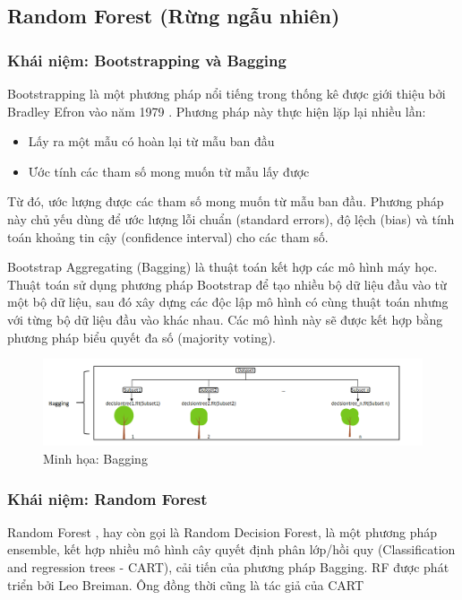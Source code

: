 \subsection{Random Forest (Rừng ngẫu nhiên)}
    \label{label:rf}
    \subsubsection{Khái niệm: Bootstrapping và Bagging}
    
    Bootstrapping là một phương pháp nổi tiếng trong thống kê được giới thiệu bởi Bradley Efron vào năm 1979 \cite{efron1992bootstrap}. Phương pháp này thực hiện lặp lại nhiều lần:
        \begin{itemize}
            \item Lấy ra một mẫu có hoàn lại từ mẫu ban đầu
            \item Ước tính các tham số mong muốn từ mẫu lấy được
        \end{itemize}
    Từ đó, ước lượng được các tham số mong muốn từ mẫu ban đầu. Phương pháp này chủ yếu dùng để ước lượng lỗi chuẩn (standard errors), độ lệch (bias) và tính toán khoảng tin cậy (confidence interval) cho các tham số.
    
    Bootstrap Aggregating (Bagging) là thuật toán kết hợp các mô hình máy học. Thuật toán sử dụng phương pháp Bootstrap để tạo nhiều bộ dữ liệu đầu vào từ một bộ dữ liệu, sau đó xây dựng các độc lập mô hình có cùng thuật toán nhưng với từng bộ dữ liệu đầu vào khác nhau. Các mô hình này sẽ được kết hợp bằng phương pháp biểu quyết đa số (majority voting).

    \begin{figure}[htp]
        \centering
        \includegraphics[width=16 cm]{images/bagging.png}
        \caption{Minh họa: Bagging}
        \label{fig:bagging}
    \end{figure}
    
    \subsubsection{Khái niệm: Random Forest}
    
    Random Forest \cite{breiman2001random}, hay còn gọi là Random Decision Forest, là một phương pháp ensemble, kết hợp nhiều mô hình cây quyết định phân lớp/hồi quy (Classification and regression trees - CART), cải tiến của phương pháp Bagging. RF được phát triển bởi Leo Breiman. Ông đồng thời cũng là tác giả của CART \cite{breiman_1984}
    
